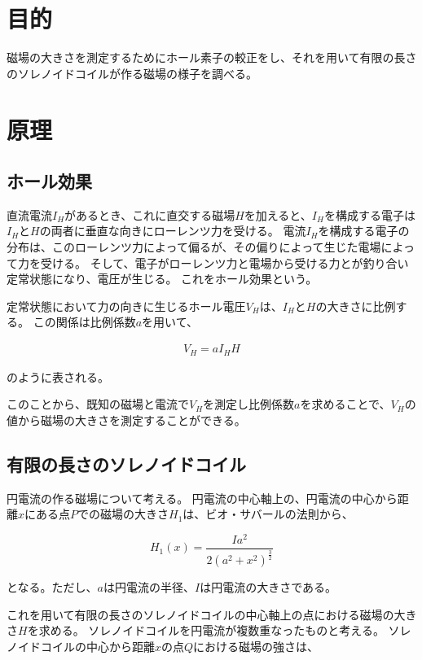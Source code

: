\documentclass[uplatex,11pt]{jsarticle}
\begin{document}
\section{目的}

磁場の大きさを測定するためにホール素子の較正をし、それを用いて有限の長さのソレノイドコイルが作る磁場の様子を調べる。

\section{原理}

\subsection{ホール効果}

直流電流$I_H$があるとき、これに直交する磁場$H$を加えると、$I_H$を構成する電子は$I_H$と$H$の両者に垂直な向きにローレンツ力を受ける。
電流$I_H$を構成する電子の分布は、このローレンツ力によって偏るが、その偏りによって生じた電場によって力を受ける。
そして、電子がローレンツ力と電場から受ける力とが釣り合い定常状態になり、電圧が生じる。
これをホール効果という。

定常状態において力の向きに生じるホール電圧$V_H$は、$I_H$と$H$の大きさに比例する。
この関係は比例係数$a$を用いて、

\begin{eqnarray}
    V_H = a I_H H \label{eq_vh_Ih_H_relation}
\end{eqnarray}

のように表される。

このことから、既知の磁場と電流で$V_H$を測定し比例係数$a$を求めることで、$V_H$の値から磁場の大きさを測定することができる。

\subsection{有限の長さのソレノイドコイル}

円電流の作る磁場について考える。
円電流の中心軸上の、円電流の中心から距離$x$にある点$P$での磁場の大きさ$H_1$は、ビオ・サバールの法則から、

\[
    H_1(x) = \frac{Ia^2}{2(a^2+x^2)^\frac{3}{2}}
\]

となる。ただし、$a$は円電流の半径、$I$は円電流の大きさである。

これを用いて有限の長さのソレノイドコイルの中心軸上の点における磁場の大きさ$H$を求める。
ソレノイドコイルを円電流が複数重なったものと考える。
ソレノイドコイルの中心から距離$x$の点$Q$における磁場の強さは、
\end{document}
